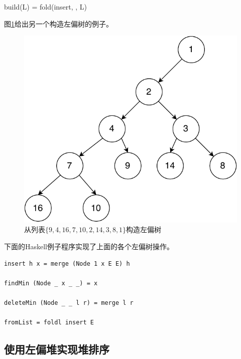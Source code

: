 \documentclass[b5paper]{ctexart}
\begin{document}
\be
build(L) = fold(insert, \phi, L)
\ee

图\ref{fig:leftist-tree}给出另一个构造左偏树的例子。

\begin{figure}[htbp]
   \begin{center}
   	  \includegraphics[scale=0.5]{img/leftist-tree}
    \caption{从列表$\{9, 4, 16, 7, 10, 2, 14, 3, 8, 1\}$构造左偏树}
    \label{fig:leftist-tree}
   \end{center}
\end{figure}

下面的Haskell例子程序实现了上面的各个左偏树操作。

\lstset{language=Haskell}
\begin{lstlisting}[style=Haskell]
insert h x = merge (Node 1 x E E) h

findMin (Node _ x _ _) = x

deleteMin (Node _ _ l r) = merge l r

fromList = foldl insert E
\end{lstlisting}

\subsection{使用左偏堆实现堆排序}
\end{document}
